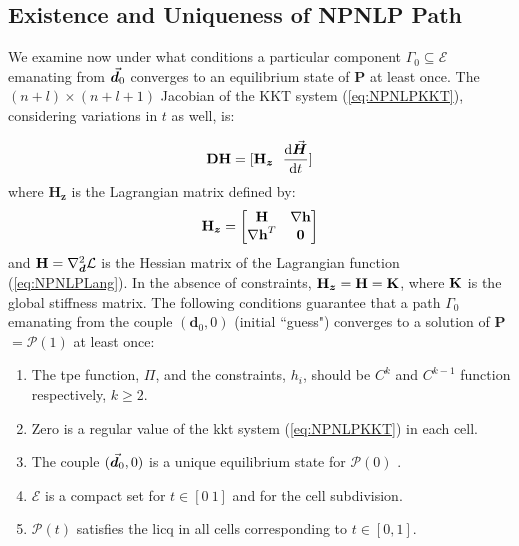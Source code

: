 \subsection{Existence and Uniqueness of NPNLP Path}\label{CH4-S2SS1}

We examine now under what conditions a particular component
$\mathit{\Gamma_0}\subseteq{\mathcal{E}}$ emanating from $\vec{\bm{d}}_0$ converges 
to an
equilibrium state of \textbf{P} at least once. The $(n+l)\times(n+l+1)$ 
Jacobian of the KKT system
(\ref{eq:NPNLPKKT}), considering variations in $t$ as well, is:

\begin{equation}
	\bmat{DH} = [\bmat{H}_{\bm{z}}\ \ \frac{\text{d}\bvec{H}}{\text{d}t}]
	\label{eq:NPNLP-J}
\end{equation}
\noindent where $\bm{H}_{\bm{z}}$ is the Lagrangian matrix defined
by:
\begin{equation}
	\mathbf{H}_{\bm{z}} = \begin{bmatrix}
		\mathbf{H} & \mathbf{\nabla h}\\
		\mathbf{\nabla h}^T & \mathbf{0}
	\end{bmatrix}
	\label{eq:LagrangianMatrix}
\end{equation}
and $\mathbf{H}= \nabla_{\bm{d}}^2\mathcal{L}$ is the Hessian matrix of the 
Lagrangian function
(\ref{eq:NPNLPLang}). In the absence of constraints, 
$\mathbf{H}_{\bm{z}}=\mathbf{H}=\mathbf{K}$,
where $\mathbf{K}$ is the global stiffness matrix. The following conditions
guarantee that a path $\mathit{\Gamma_0}$ emanating 
from the couple $(\bm{d}_0,0)$ (initial ``guess") converges
to a solution of \textbf{P} $=\bm{\mathcal{P}}(1)$ at least 
once\cite{Gfrerer:1985}:
\begin{enumerate}
	\item The \acrshort{tpe} function, $\Pi$, and the constraints, $h_i$, 
	should be $C^k$
	and $C^{k-1}$ function respectively, $k\geq 2$.
	\item Zero is a regular value of the \acrshort{kkt} system 
	(\ref{eq:NPNLPKKT}) in each
	cell.
	\item The couple $(\vec{\bm{d}}_0,0)$ is a unique equilibrium state for
	$\bm{\mathcal{P}}(0)$ .
	\item $\mathcal{E}$ is a compact set for $t\in[0\ 1]$ and for the cell
	subdivision.
	\item $\bm{\mathcal{P}}(t)$ satisfies the \acrshort{licq} in all 
	cells corresponding to $t\in[0,1]$.
\end{enumerate}

